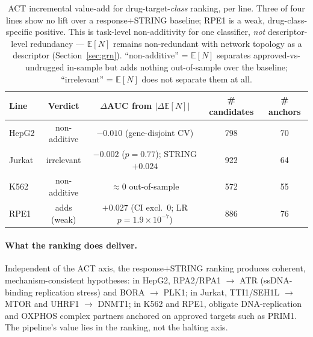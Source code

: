 \documentclass[11pt]{article}
\newcommand{\EN}{\ensuremath{\mathbb{E}[N]}}
\begin{document}
\begin{table}[t]
\centering
\caption{ACT incremental value-add for drug-target-\emph{class} ranking, per line. Three of four
lines show no lift over a response$+$STRING baseline; RPE1 is a weak, drug-class-specific positive.
This is task-level non-additivity for one classifier, \emph{not} descriptor-level redundancy ---
\EN{} remains non-redundant with network topology as a descriptor (Section~\ref{sec:grn}).
``non-additive'' = \EN{} separates approved-vs-undrugged in-sample but adds nothing out-of-sample
over the baseline; ``irrelevant'' = \EN{} does not separate them at all.}
\label{tab:drug}
\begin{tabular}{lcccc}
\toprule
\textbf{Line} & \textbf{Verdict} & \textbf{$\Delta$AUC from $|\Delta\EN{}|$} & \textbf{\# candidates} & \textbf{\# anchors} \\
\midrule
HepG2  & non-additive & $-0.010$ (gene-disjoint CV)           & 798 & 70 \\
Jurkat & irrelevant & $-0.002$ ($p=0.77$); STRING $+0.024$  & 922 & 64 \\
K562   & non-additive & $\approx 0$ out-of-sample             & 572 & 55 \\
RPE1   & adds (weak)& $+0.027$ (CI excl.\ 0; LR $p=1.9\!\times\!10^{-7}$) & 886 & 76 \\
\bottomrule
\end{tabular}
\end{table}

\paragraph{What the ranking does deliver.} Independent of the ACT axis, the response$+$STRING
ranking produces coherent, mechanism-consistent hypotheses: in HepG2, RPA2/RPA1 $\rightarrow$ ATR
(ssDNA-binding replication stress) and BORA $\rightarrow$ PLK1; in Jurkat, TTI1/SEH1L
$\rightarrow$ MTOR and UHRF1 $\rightarrow$ DNMT1; in K562 and RPE1, obligate DNA-replication and
OXPHOS complex partners anchored on approved targets such as PRIM1. The pipeline's value lies in
the ranking, not the halting axis.
\end{document}
